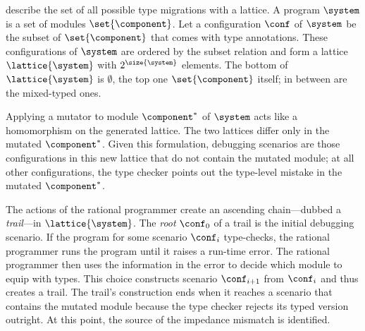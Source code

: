 
\citet{tfgnvf-popl-2016} describe the set of all possible type migrations with a
lattice. A program $\system$ is a set of modules $\set{\component}$.
Let a configuration $\conf$ of $\system$ be the subset of $\set{\component}$
that comes with type annotations. These configurations of $\system$ are ordered
by the subset relation and form a lattice $\lattice{\system}$ with
$2^{\size{\system}}$ elements. The bottom of $\lattice{\system}$ is
$\emptyset$, the top one $\set{\component}$ itself; in between are the mixed-typed ones.

Applying a mutator to module $\component^*$ of $\system$ acts like a homomorphism
on the generated lattice. The two lattices differ only in the mutated
$\component^*$. Given this formulation, debugging scenarios are those configurations in
this new lattice that do not contain the mutated module; at all other configurations, the type
checker points out the type-level mistake in the mutated $\component^*$.

The actions of the rational programmer create an ascending chain---dubbed a
\emph{trail}---in $\lattice{\system}$.  The {\em root\/} $\conf_0$ of a trail is
the initial debugging scenario. If the program for some scenario  $\conf_i$ type-checks,
the rational programmer runs the program until it raises a run-time error.  The
rational programmer then uses the information in the error to decide which module to
equip with types. This choice constructs scenario $\conf_{i+1}$ from $\conf_{i}$
and thus creates a trail. The trail's construction ends when it reaches a
scenario that contains the mutated module because the type checker rejects its
typed version outright.  At this point, the source of the impedance mismatch is
identified.
